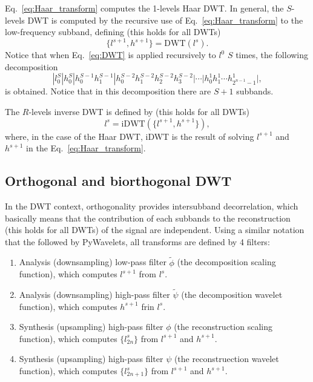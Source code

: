 Eq.~\ref{eq:Haar_transform} computes the 1-levels Haar DWT. In
general, the $S$-levels DWT is computed by the recursive use of
Eq.~\ref{eq:Haar_transform} to the low-frequency subband, defining
(this holds for all DWTs)
\begin{equation}
  \{l^{s+1}, h^{s+1}\} = \text{DWT}(l^s).
  \label{eq:DWT}
\end{equation}
Notice that when Eq.~\ref{eq:DWT} is applied recursively to $l^0$ $S$
times, the following decomposition
  \begin{equation}
    | l^S_0 | h^S_0 | h^{S-1}_0 h^{S-1}_1 | h^{S-2}_0 h^{S-2}_1 h^{S-2}_2 h^{S-2}_3 | \cdots | h^1_0 h^1_1 \cdots h^1_{2^{n-1}-1} |,
  \end{equation}
  is obtained. Notice that in this decomposition there are $S+1$
  subbands.

The $R$-levels inverse DWT is defined by (this holds for all DWTs)
\begin{equation}
  l^s = \text{iDWT}(\{l^{s+1}, h^{s+1}\}),
\end{equation}
where, in the case of the Haar DWT, iDWT is the result of solving
$l^{s+1}$ and $h^{s+1}$ in the Eq.~\ref{eq:Haar_transform}.

\subsection{Orthogonal and biorthogonal DWT}
In the DWT context, orthogonality provides intersubband decorrelation,
which basically means that the contribution of each subbands to the
reconstruction (this holds for all DWTs) of the signal are
independent. Using a similar notation that the followed by PyWavelets,
all transforms are defined by 4 filters:
\begin{enumerate}
\item Analysis (downsampling) low-pass filter $\tilde\phi$ (the decomposition
  scaling function), which computes $l^{s+1}$ from $l^s$.
\item Analysis (downsampling) high-pass filter $\tilde\psi$ (the decomposition
  wavelet function), which computes $h^{s+1}$ frin $l^s$.
\item Synthesis (upsampling) high-pass filter $\phi$ (the
  reconstruction scaling function), which computes $\{l^s_{2n}\}$ from
  $l^{s+1}$ and $h^{s+1}$.
\item Synthesis (upsampling) high-pass filter $\psi$ (the
  reconstruection wavelet function), which computes $\{l^s_{2n+1}\}$
  from $l^{s+1}$ and $h^{s+1}$.
\end{enumerate}

